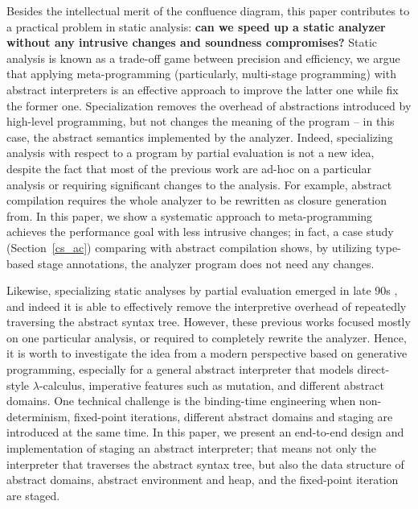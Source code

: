 Besides the intellectual merit of the confluence diagram, this paper contributes
to a practical problem in static analysis: \textbf{can we speed up a static
analyzer without any intrusive changes and soundness compromises?} Static
analysis is known as a trade-off game between precision and efficiency, we argue
that applying meta-programming (particularly, multi-stage programming) with
abstract interpreters is an effective approach to improve the latter one while
fix the former one. Specialization removes the overhead of abstractions
introduced by high-level programming, but not changes the meaning of the program
-- in this case, the abstract semantics implemented by the analyzer. Indeed,
specializing analysis with respect to a program by partial evaluation
\cite{damian1999partial, amtoft1999partial, Boucher:1996:ACN:647473.727587,
ashley:practical} is not a new idea, despite the fact that most of the previous
work are ad-hoc on a particular analysis or requiring significant changes to the
analysis. For example, abstract compilation
\cite{Boucher:1996:ACN:647473.727587} requires the whole analyzer to be
rewritten as closure generation from. In this paper, we show a systematic
approach to meta-programming achieves the performance goal with less intrusive
changes; in fact, a case study (Section~\ref{cs_ac}) comparing with abstract
compilation shows, by utilizing type-based stage annotations, the analyzer
program does not need any changes.


\iffalse
Likewise, specializing static analyses by partial evaluation emerged in late 90s
, and indeed it is able to effectively remove the interpretive
overhead of repeatedly traversing the abstract syntax tree. However, these
previous works focused mostly on one particular analysis, or required to
completely rewrite the analyzer. Hence, it is worth to investigate the idea from
a modern perspective based on generative programming, especially for a general
abstract interpreter that models direct-style $\lambda$-calculus, imperative
features such as mutation, and different abstract domains. One technical
challenge is the binding-time engineering when non-determinism, fixed-point
iterations, different abstract domains and staging are introduced at the same
time. In this paper, we present an end-to-end design and implementation of
staging an abstract interpreter; that means not only the interpreter that
traverses the abstract syntax tree, but also the data structure of abstract
domains, abstract environment and heap, and the fixed-point iteration are
staged.

